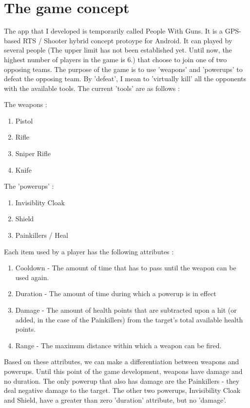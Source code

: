\documentclass{article}
\begin{document}
\section{The game concept}
The app that I developed is temporarily called People With Guns. It is a GPS-
based RTS / Shooter hybrid concept protoype for Android. It can played by
several people (The upper limit has not been established yet. Until now, the
highest number of players in the game is 6.) that choose to join one of two
opposing teams. The purpose of the game is to use 'weapons' and 'powerups' to
defeat the opposing team. By 'defeat', I mean to 'virtually kill' all the
opponents with the available tools. The current 'tools' are as follows :\newline 

The weapons : 
\begin{enumerate}
  \item Pistol
  \item Rifle
  \item Sniper Rifle
  \item Knife   
\end{enumerate}

The 'powerups' :
\begin{enumerate}
  \item Invisiblity Cloak
  \item Shield
  \item Painkillers / Heal
\end{enumerate}

Each item used by a player has the following attributes : 
\begin{enumerate}
  \item Cooldown - The amount of time that has to pass until the weapon can be
  used again.
  \item Duration - The amount of time during which a powerup is in effect 
  \item Damage - The amount of health points that are subtracted upon a hit (or
  added, in the case of the Painkillers) from the target's total available
  health points.
  \item Range - The maximum distance within which a weapon can be fired.
\end{enumerate}

Based on these attributes, we can make a differentiation between weapons and
powerups. Until this point of the game development, weapons have damage and no
duration. The only powerup that also has damage are the Painkillers - they deal
negative damage to the target. The other two powerups, Invisibility Cloak and
Shield, have a greater than zero 'duration' attribute, but no 'damage'.\newline
\end{document}

